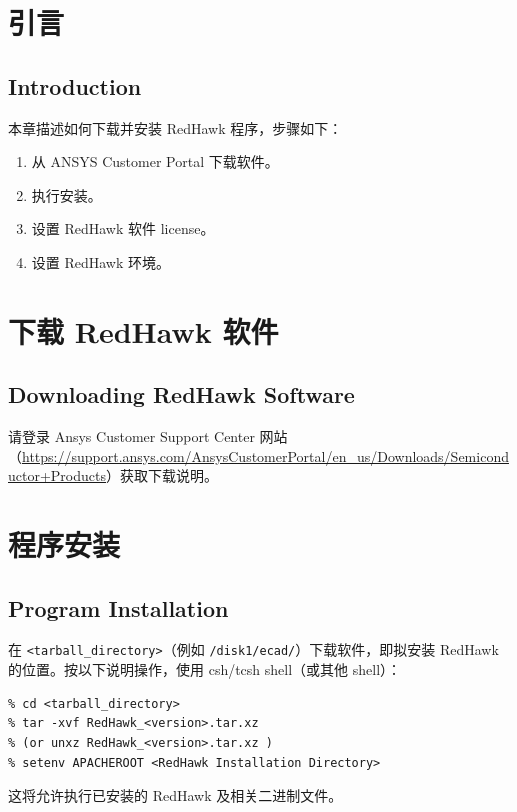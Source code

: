 ﻿%
\label{chap:install}

\section{引言}
\subsection*{Introduction}

本章描述如何下载并安装 RedHawk 程序，步骤如下：
\begin{enumerate}
  \item 从 ANSYS Customer Portal 下载软件。
  \item 执行安装。
  \item 设置 RedHawk 软件 license。
  \item 设置 RedHawk 环境。
\end{enumerate}

\section{下载 RedHawk 软件}
\subsection*{Downloading RedHawk Software}

请登录 Ansys Customer Support Center 网站（\url{https://support.ansys.com/AnsysCustomerPortal/en\_us/Downloads/Semiconductor+Products}）获取下载说明。

\section{程序安装}
\subsection*{Program Installation}

在 \texttt{<tarball\_directory>}（例如 \texttt{/disk1/ecad/}）下载软件，即拟安装 RedHawk 的位置。按以下说明操作，使用 csh/tcsh shell（或其他 shell）：
\begin{lstlisting}
% cd <tarball_directory>
% tar -xvf RedHawk_<version>.tar.xz
% (or unxz RedHawk_<version>.tar.xz )
% setenv APACHEROOT <RedHawk Installation Directory>
\end{lstlisting}

这将允许执行已安装的 RedHawk 及相关二进制文件。

